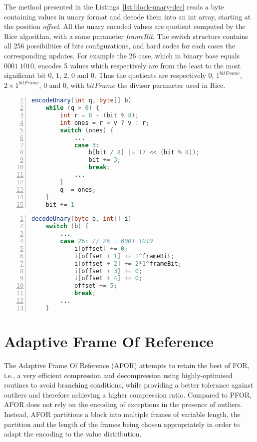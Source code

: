 The method presented in the Listings~\ref{lst:block-unary-dec} reads a byte
containing values in unary format and decode them into an int array, starting
at the position \emph{offset}. All the unary encoded values are quotient
computed by the Rice algorithm, with a same parameter \emph{frameBit}. The
switch structure contains all 256 possibilities of bits configurations, and
hard codes for each cases the corresponding updates. For example the 26 case,
which in binary base equals $0001\;1010$, encodes 5 values which respectively
are from the least to the most significant bit $0$, $1$, $2$, 0 and 0. Thus the
quotients are respectively 0, $1^{bitFrame}$, $2\times1^{bitFrame}$, 0 and 0,
with $bitFrame$ the divisor parameter used in Rice.

\begin{fileformat}
  \centering
  \begin{minipage}[t]{0.47\linewidth}
\begin{lstlisting}[frame=lines,language=Java,numbers=left,caption=Unary
format encoding.,label=lst:optimized-unary-enc]
encodeUnary(int q, byte[] b)
	while (q > 0) {
		int r = 8 - (bit % 8);
		int ones = r > v ? v : r;
		switch (ones) {
			...
			case 3:
				b[bit / 8] |= (7 << (bit % 8));
				bit += 3;
				break;
			...
		}
		q -= ones;
	}
	bit += 1
\end{lstlisting}
  \end{minipage}
  \quad%
  \begin{minipage}[t]{0.47\linewidth}
\begin{lstlisting}[frame=lines,language=Java,numbers=left,caption=Byte-based
unary format decoding.,label=lst:block-unary-dec]
decodeUnary(byte b, int[] i)
	switch (b) {
		...
		case 26: // 26 = 0001 1010
			i[offset] += 0;
			i[offset + 1] += 1^frameBit;
			i[offset + 2] += 2*1^frameBit;
			i[offset + 3] += 0;
			i[offset + 4] += 0;
			offset += 5;
			break;
		...
	}
\end{lstlisting}
  \end{minipage}
\end{fileformat}

\section{Adaptive Frame Of Reference}{
The Adaptive Frame Of Reference (AFOR) attempts to retain the best of FOR,
i.e., a very efficient compression and decompression using highly-optimised
routines to avoid branching conditions, while providing a better tolerance
against outliers and therefore achieving a higher compression ratio. Compared
to PFOR, AFOR does not rely on the encoding of exceptions in the presence of
outliers. Instead, AFOR partitions a block into multiple frames of variable
length, the partition and the length of the frames being chosen appropriately
in order to adapt the encoding to the value distribution.
}
\label{sec:afor}

